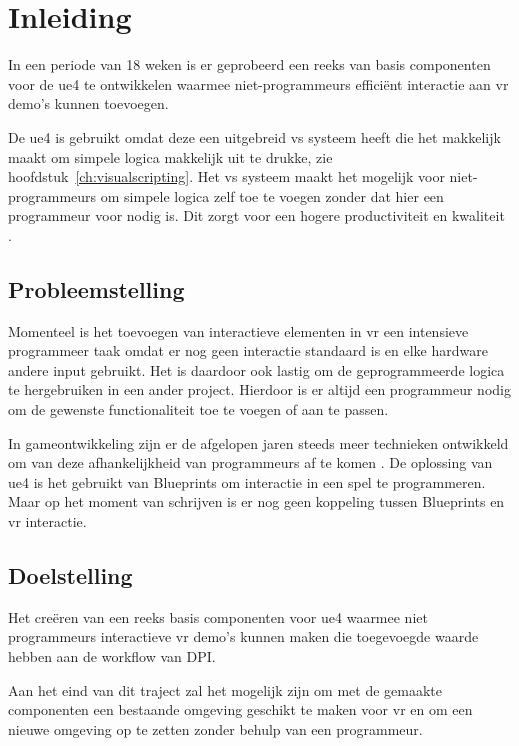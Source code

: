 \chapter{Inleiding}

In een periode van 18 weken is er geprobeerd een reeks van basis componenten voor de \gls{ue4} te ontwikkelen waarmee niet-programmeurs efficiënt interactie aan \gls{vr} demo’s kunnen toevoegen.

De \gls{ue4} is gebruikt omdat deze een uitgebreid \gls{vs} systeem heeft die het makkelijk maakt om simpele logica makkelijk uit te drukke, zie hoofdstuk~\ref{ch:visualscripting}. Het \gls{vs} systeem maakt het mogelijk voor niet-programmeurs om simpele logica zelf toe te voegen zonder dat hier een programmeur voor nodig is. Dit zorgt voor een hogere productiviteit en kwaliteit \cite{Cutumisu200732}.

\section{Probleemstelling}

Momenteel is het toevoegen van interactieve elementen in \gls{vr} een intensieve programmeer taak omdat er nog geen interactie standaard is en elke hardware andere input gebruikt. Het is daardoor ook lastig om de geprogrammeerde logica te hergebruiken in een ander project. Hierdoor is er altijd een programmeur nodig om de gewenste functionaliteit toe te voegen of aan te passen. 

In gameontwikkeling zijn er de afgelopen jaren steeds meer technieken ontwikkeld om van deze afhankelijkheid van programmeurs af te komen \cite{Cutumisu200732, ambientbehav}. De oplossing van \gls{ue4} is het gebruikt van Blueprints om interactie in een spel te programmeren. Maar op het moment van schrijven is er nog geen koppeling tussen Blueprints en \gls{vr} interactie.

\section{Doelstelling}

Het creëren van een reeks basis componenten voor \gls{ue4} waarmee niet programmeurs interactieve \gls{vr} demo’s kunnen maken die toegevoegde waarde hebben aan de workflow van DPI.

Aan het eind van dit traject zal het mogelijk zijn om met de gemaakte componenten een bestaande omgeving geschikt te maken voor \gls{vr} en om een nieuwe omgeving op te zetten zonder behulp van een programmeur.

